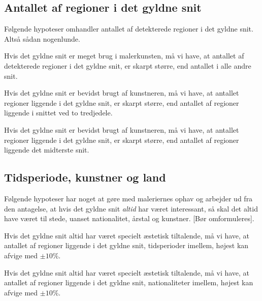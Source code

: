 {\subsection{Antallet af regioner i det gyldne snit}
Følgende hypoteser omhandler antallet af detekterede regioner i det
gyldne snit. Altså sådan nogenlunde.

\begin{hypotese}
    Hvis det gyldne snit er meget brug i malerkunsten, må vi have, at
    antallet af detekterede regioner i det gyldne snit, er skarpt
    større, end antallet i alle andre snit.
\end{hypotese}

\begin{hypotese}
    Hvis det gyldne snit er bevidst brugt af kunstneren, må vi have, at
    antallet regioner liggende i det gyldne snit, er skarpt større, end
    antallet af regioner liggende i snittet ved to tredjedele.
\end{hypotese}

\begin{hypotese}
    Hvis det gyldne snit er bevidst brugt af kunstneren, må vi have, at
    antallet regioner liggende i det gyldne snit, er skarpt større, end
    antallet af regioner liggende det midterste snit.
\end{hypotese}

\subsection{Tidsperiode, kunstner og land}
Følgende hypoteser har noget at gøre med maleriernes ophav og arbejder
ud fra den antagelse, at hvis det gyldne snit \emph{altid} har været
interessant, så skal det altid have været til stede, uanset
nationalitet, årstal og kunstner. [Bør omformuleres].

\begin{hypotese}
    Hvis det gyldne snit altid har været specielt æstetisk tiltalende,
    må vi have, at antallet af regioner liggende i det gyldne snit,
    tidsperioder imellem, højest kan afvige med $\pm10\%$.
\end{hypotese}

\begin{hypotese}
    Hvis det gyldne snit altid har været specielt æstetisk tiltalende,
    må vi have, at antallet af regioner liggende i det gyldne snit,
    nationaliteter imellem, højest kan afvige med $\pm10\%$.
\end{hypotese}

}

